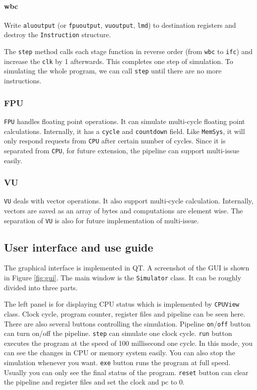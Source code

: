 \documentclass{sig-alternate}
\begin{document}
\paragraph{wbc}
Write \texttt{aluoutput} (or \texttt{fpuoutput}, \texttt{vuoutput}, \texttt{lmd}) to destination registers and destroy the \texttt{Instruction} structure.

The \texttt{step} method calls each stage function in reverse order (from \texttt{wbc} to \texttt{ifc}) and increase the \texttt{clk} by 1 afterwards. This completes one step of simulation. To simulating the whole program, we can call \texttt{step} until there are no more instructions. 


\subsubsection{FPU}
\texttt{FPU} handles floating point operations. It can simulate multi-cycle floating point calculations. Internally, it has a \texttt{cycle} and \texttt{countdown} field. Like \texttt{MemSys}, it will only respond requests from \texttt{CPU} after certain number of cycles. Since it is separated from \texttt{CPU}, for future extension, the pipeline can support multi-issue easily. 

\subsubsection{VU}
\texttt{VU} deals with vector operations. It also support multi-cycle calculation. Internally, vectors are saved as an array of bytes and computations are element wise. The separation of \texttt{VU} is also for future implementation of multi-issue.

\subsection{User interface and use guide}
The graphical interface is implemented in QT. A screenshot of the GUI is shown in Figure \ref{fig:gui}. The main window is the \texttt{Simulator} class. It can be roughly divided into three parts. 

The left panel is for displaying CPU status which is implemented by \texttt{CPUView} class. Clock cycle, program counter, register files and pipeline can be seen here. There are also several buttons controlling the simulation. Pipeline \texttt{on}/\texttt{off} button can turn on/off the pipeline. \texttt{step} can simulate one clock cycle. \texttt{run} button executes the program at the speed of 100 millisecond one cycle. In this mode, you can see the changes in CPU or memory system easily. You can also stop the simulation whenever you want. \texttt{exe} button runs the program at full speed. Usually you can only see the final status of the program. \texttt{reset} button can clear the pipeline and register files and set the clock and pc to 0. 
\end{document}
